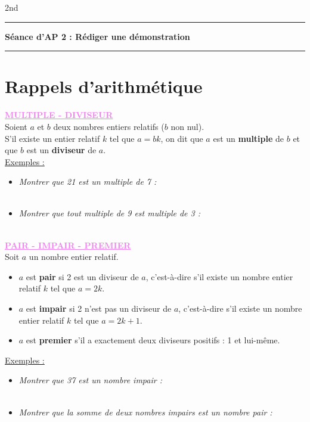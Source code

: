 \documentclass[a4paper,12pt]{article}
\newcommand{\bi}{\begin{itemize}}
\newcommand{\ei}{\end{itemize}}
\newcommand{\reponse}[1][1]{%
\multido{}{#1}{\makebox[\linewidth]{\rule[0pt]{0pt}{20pt}\dotfill}
}}
\newcommand{\titre}[5] 
{
\noindent #2 \hfill #4 \\
#3 \hfill #5

\vspace{-1.6cm}

\begin{center}\rule{6cm}{0.5mm}\end{center}
\vspace{0.2cm}
\begin{center}{\Large{\textbf{#1}}}\end{center}
\begin{center}\rule{6cm}{0.5mm}\end{center}
}
\begin{document}
\pagestyle{empty}

\titre{Séance d'AP 2 : Rédiger une démonstration}{}{}{2nd}{}

\vspace*{0.2cm}

\section{Rappels d'arithmétique}



\textbf{\textcolor{violet}{\underline{MULTIPLE - DIVISEUR}}}\\
Soient $a$ et $b$ deux nombres entiers relatifs ($b$ non nul).\\
S'il existe un entier relatif $k$ tel que $a = bk$, on dit que $a$ est un \textbf{multiple} de $b$ et que $b$ est un \textbf{diviseur} de $a$.\\

\underline{Exemples :}
\bi
\item\textit{Montrer que 21 est un multiple de 7 : }\\
\reponse[2]\\

\item \textit{Montrer que tout multiple de 9 est multiple de 3 :} \\
\reponse[6]\\
\ei

\vspace*{0.5cm}

\textbf{\textcolor{violet}{\underline{PAIR - IMPAIR - PREMIER}}}\\
Soit $a$ un nombre entier relatif.
\bi 
\item $a$ est \textbf{pair} si 2 est un diviseur de $a$, c'est-à-dire s'il existe un nombre entier relatif $k$ tel que $a = 2k$.
\item $a$ est \textbf{impair} si 2 n’est pas un diviseur de $a$, c'est-à-dire s'il existe un nombre entier relatif $k$ tel que $a = 2k + 1$.
\item $a$ est \textbf{premier} s'il a exactement deux diviseurs positifs : 1 et lui-même.\\
\ei

\underline{Exemples :}
\bi
\item \textit{Montrer que 37 est un nombre impair :}\\
\reponse[2]\\
 
\item \textit{Montrer que la somme de deux nombres impairs est un nombre pair :}\\
 \reponse[6]\\
\ei
\end{document}
